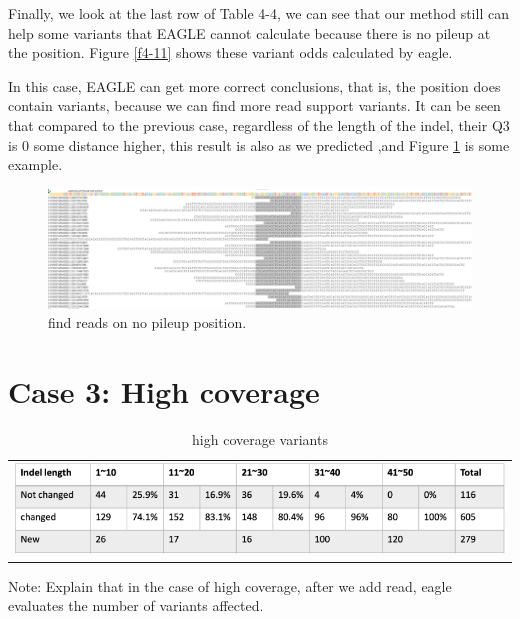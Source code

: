 Finally, we look at the last row of Table 4-4, we can see that our method still can help some variants that EAGLE cannot calculate because there is no pileup at the position. Figure \ref{f4-11} shows these variant odds calculated by eagle.

In this case, EAGLE can get more correct conclusions, that is, the position does contain variants, because we can find more read support variants. It can be seen that compared to the previous case, regardless of the length of the indel, their Q3 is 0 some distance higher, this result is also as we predicted ,and Figure \ref{f4-12} is some example.

\vspace{1cm}
\begin{figure}[H]
    \centering
    \includegraphics[width=1\columnwidth]{body/image/4-12.png}
    \captionsetup{labelfont=bf}
    \renewcommand{\baselinestretch}{1.0}
    \vspace{-1cm}
    \caption[find new pileup reads in medium coverage]{find reads on no pileup position.}
    \label{f4-12}
\end{figure}

\section{Case 3: High coverage}
\begin{table}[h]
    \centering
    \caption[high coverage variants]{high coverage variants}
     \vspace{-0.5cm}
    \begin{tabular}{c}
        \includegraphics[width=1\textwidth]{body/image/t4-6.png}
    \end{tabular}
    \label{t4-6}
    {Note: Explain that in the case of high coverage, after we add read, eagle evaluates the number of variants affected.}
\end{table}


